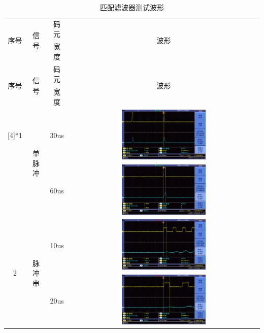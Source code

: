 \documentclass[12pt]{article}
\begin{document}
\begin{longtable}{|c|c|c|c|}
    \caption{匹配滤波器测试波形}
    \label{tab:PPLVQCSBX2}\\
    \hline
    \multirow{2}[4]{*}{序号}&\multirow{2}[4]{*}{信号}&码元&\multirow{2}[4]{*}{波形}\\
    & &宽度&\\
    \hline
    \endfirsthead

    \hline
    \multirow{2}[4]{*}{序号}&\multirow{2}[4]{*}{信号}&码元&\multirow{2}[4]{*}{波形}\\
    & &宽度&\\
    \hline
    \endhead

    \hline
    \endfoot


    \endlastfoot

   \multirow{2}[4]{*}{1} & \multirow{2}[4]{*}{单脉冲} & 30us &\includegraphics[width=0.45\textwidth]{data/new/F0025TEK}  \\
\cline{3-4}      &   & 60us & \includegraphics[width=0.45\textwidth]{data/new/F0026TEK}\\
    \hline
   \multirow{2}[4]{*}{2} & \multirow{2}[4]{*}{脉冲串} & 10us & \includegraphics[width=0.45\textwidth]{data/new/F0030TEK}\\
\cline{3-4}      &   & 20us & \includegraphics[width=0.45\textwidth]{data/new/F0031TEK} \\

\end{longtable}
\end{document}
